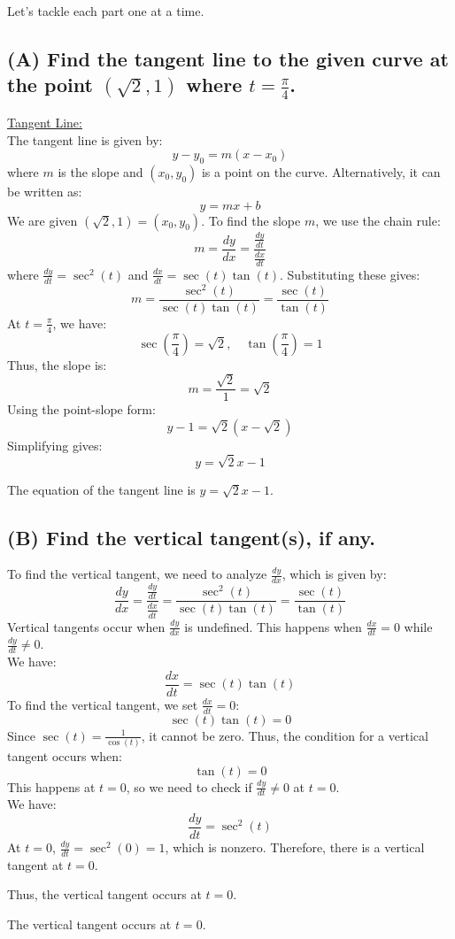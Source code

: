 \documentclass{article}
\begin{document}
Let's tackle each part one at a time.

\subsection*{(A) Find the tangent line to the given curve at the point \( (\sqrt{2}, 1) \) where \( t = \frac{\pi}{4} \).}

\begin{solutionbox}
\underline{Tangent Line:} \\
The tangent line is given by:
\[
    y - y_0 = m(x - x_0)
\]
where \( m \) is the slope and \( (x_0, y_0) \) is a point on the curve. Alternatively, it can be written as:
\[
    y = mx + b
\]
We are given \( (\sqrt{2}, 1) = (x_0, y_0) \). To find the slope \( m \), we use the chain rule:
\[
    m = \frac{dy}{dx} = \frac{\frac{dy}{dt}}{\frac{dx}{dt}}
\]
where \( \frac{dy}{dt} = \sec^2(t) \) and \( \frac{dx}{dt} = \sec(t)\tan(t) \). Substituting these gives:
\[
    m = \frac{\sec^2(t)}{\sec(t)\tan(t)} = \frac{\sec(t)}{\tan(t)}
\]
At \( t = \frac{\pi}{4} \), we have:
\[
    \sec\left(\frac{\pi}{4}\right) = \sqrt{2}, \quad \tan\left(\frac{\pi}{4}\right) = 1
\]
Thus, the slope is:
\[
    m = \frac{\sqrt{2}}{1} = \sqrt{2}
\]
Using the point-slope form:
\[
    y - 1 = \sqrt{2}(x - \sqrt{2})
\]
Simplifying gives:
\[
    y = \sqrt{2}x - 1
\]
\begin{answerbox}
The equation of the tangent line is \( y = \sqrt{2}x - 1 \).
\end{answerbox}
\end{solutionbox}

\subsection*{(B) Find the vertical tangent(s), if any.}

\begin{solutionbox}
To find the vertical tangent, we need to analyze \( \frac{dy}{dx} \), which is given by:
\[
    \frac{dy}{dx} = \frac{\frac{dy}{dt}}{\frac{dx}{dt}} = \frac{\sec^2(t)}{\sec(t)\tan(t)} = \frac{\sec(t)}{\tan(t)}
\]
Vertical tangents occur when \( \frac{dy}{dx} \) is undefined. This happens when \( \frac{dx}{dt} = 0 \) while \( \frac{dy}{dt} \neq 0 \). \\
We have:
\[
    \frac{dx}{dt} = \sec(t)\tan(t)
\]
To find the vertical tangent, we set \( \frac{dx}{dt} = 0 \):
\[
    \sec(t)\tan(t) = 0
\]
Since \( \sec(t) = \frac{1}{\cos(t)} \), it cannot be zero. Thus, the condition for a vertical tangent occurs when:
\[
    \tan(t) = 0
\]
This happens at \( t = 0 \), so we need to check if \( \frac{dy}{dt} \neq 0 \) at \( t = 0 \). \\
We have:
\[
    \frac{dy}{dt} = \sec^2(t)
\]
At \( t = 0 \), \( \frac{dy}{dt} = \sec^2(0) = 1 \), which is nonzero. Therefore, there is a vertical tangent at \( t = 0 \).

Thus, the vertical tangent occurs at \( t = 0 \).
\begin{answerbox}
The vertical tangent occurs at \( t = 0 \).
\end{answerbox}
\end{solutionbox}
\end{document}
